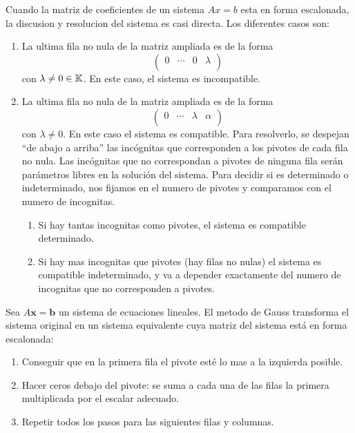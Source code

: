 Cuando la matriz de coeficientes de un sistema \(Ax = b \) esta en forma escalonada, la discusion y resolucion del sistema es casi directa. Los diferentes casos son:
\begin{enumerate}
	\item La ultima fila no nula de la matriz ampliada es de la forma
	      \[
		      \left (
		      \begin{array}{ccc|c}
				      0 & \cdots & 0 & \lambda \\
			      \end{array}\right )
	      \]
	      con \(\lambda \neq  0 \in \mathbb{K} \). En este caso, el sistema es incompatible.
	\item La ultima fila no nula de la matriz ampliada es de la forma
	      \[
		      \left (
		      \begin{array}{ccc|c}
				      0 & \cdots & \lambda & \alpha \\
			      \end{array}\right )
	      \]
	      con \(\lambda \neq  0 \). En este caso el sistema es compatible. Para resolverlo, se despejan ``de abajo a arriba'' las incógnitas que corresponden a los pivotes de cada fila no nula. Las incógnitas que no correspondan a pivotes de ninguna fila serán parámetros libres en la solución del sistema. Para decidir si es determinado o indeterminado, nos fijamos en el numero de pivotes y comparamos con el numero de incognitas.
	      \begin{enumerate}
		      \item Si hay tantas incognitas como pivotes, el sistema es compatible determinado.
		      \item Si hay mas incognitas que pivotes (hay filas no nulas) el sistema es compatible indeterminado, y va a depender exactamente del numero de incognitas que no corresponden a pivotes.
	      \end{enumerate}
\end{enumerate}

\begin{proposition}
	Sea \(A\mathbf{x}  = \mathbf{b} \) un sistema de ecuaciones lineales. El metodo de Gauss transforma el sistema original en un sistema equivalente cuya matriz del sistema está en forma escalonada:
	\begin{enumerate}
		\item Conseguir que en la primera fila el pivote esté lo mas a la izquierda posible.
		\item Hacer ceros debajo del pivote: se suma a cada una de las filas la primera multiplicada por el escalar adecuado.
		\item Repetir todos los pasos para las siguientes filas y columnas.
	\end{enumerate}
\end{proposition}

